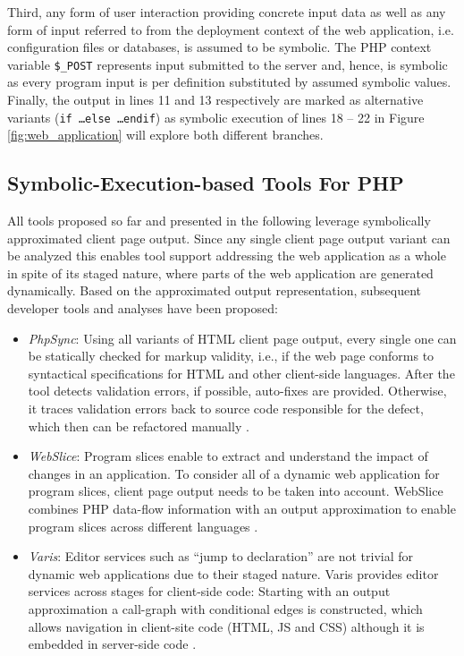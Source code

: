 \documentclass[sigconf]{acmart}
\renewcommand{\sf}[1]{\textsf{#1}}
\begin{document}
Third, any form of user interaction providing concrete input data as well as any
form of input referred to from the deployment context of the web application, i.e. configuration files
or databases, is assumed to be symbolic. The PHP context variable
\texttt{\$\_POST} represents input submitted to the server and, hence, is
symbolic as every program input is per definition substituted by assumed
symbolic values. Finally, the output in lines 11 and 13 respectively are marked as alternative variants
(\texttt{if \ldots else \ldots endif}) as symbolic execution of lines 18 – 22
in Figure \ref{fig:web_application} will explore both different branches.

\subsection{Symbolic-Execution-based Tools For PHP}\label{sec:existing_tools}
All tools proposed so far and presented in the following leverage symbolically
approximated client page output. Since any single client page output variant can
be analyzed this enables tool support addressing the web application as a whole
in spite of its staged nature, where parts of the web application are
generated dynamically.
Based on the approximated output representation, subsequent developer tools and
analyses have been proposed:
\begin{itemize}
	\item \emph{PhpSync}: Using all variants of HTML client page output, every
	single one can be statically checked for markup validity, i.e., if the web page
	conforms to syntactical specifications for HTML and other client-side
	languages. After the tool detects validation errors, if possible, auto-fixes
	are provided. Otherwise, it traces validation errors back to
	source code responsible for the defect, which then can be refactored manually
	\cite{Nguyen:2011:AFH:2190078.2190142}. 

	\item \emph{WebSlice}: Program slices enable to extract and understand the
	impact of changes in an application. To consider all of a dynamic web
	application for program slices, client page output needs to be taken into
	account. \sf{WebSlice} combines PHP data-flow information with an output
	approximation to enable program slices across different languages
	\cite{Nguyen:2015:CPS:2786805.2786872}.

	\item \emph{Varis}: Editor services such as “jump to declaration” are
	not trivial for dynamic web applications due to their staged nature. \sf{Varis}
	provides editor services across stages for client-side code: Starting with an
	output approximation a call-graph with conditional edges is constructed, which
	allows navigation in client-site code (HTML, JS and CSS) although it is
	embedded in server-side code
	\cite{Nguyen:2015:VIS:2819009.2819140,Nguyen:2014:BCG:2635868.2635928}.

\end{itemize}
\end{document}
